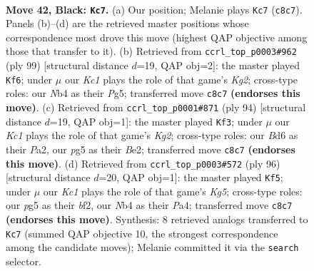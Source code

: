 \documentclass[11pt]{article}
\begin{document}
\clearpage

\begin{figure}[p]\centering
\begin{subfigure}{0.46\textwidth}\centering
\resizebox{\linewidth}{!}{%
\newchessgame
\chessboard[
  setfen={2k5/B7/3b2p1/6P1/pnb5/8/8/4K1N1 b - - 19 42},
  showmover=false,
  pgfstyle=straightmove, color=movearrow, markmove={c8-c7}
]}
\caption{}
\end{subfigure}\hfill
\begin{subfigure}{0.46\textwidth}\centering
\resizebox{\linewidth}{!}{%
\newchessgame
\chessboard[
  setfen={8/1b2b1k1/4p3/6p1/3P4/3B2P1/3N1K2/8 b - - 3 50},
  showmover=false,
  pgfstyle=straightmove, color=movearrow, markmove={g7-f6}
]}
\caption{}
\end{subfigure}
\\[4pt]
\begin{subfigure}{0.46\textwidth}\centering
\resizebox{\linewidth}{!}{%
\newchessgame
\chessboard[
  setfen={8/p7/3k3p/8/1P1b4/8/P3B1KP/8 w - - 3 48},
  showmover=false,
  pgfstyle=straightmove, color=movearrow, markmove={g2-f3}
]}
\caption{}
\end{subfigure}\hfill
\begin{subfigure}{0.46\textwidth}\centering
\resizebox{\linewidth}{!}{%
\newchessgame
\chessboard[
  setfen={5k2/8/4P3/p2p2K1/P7/2p5/2B2bP1/8 w - - 0 49},
  showmover=false,
  pgfstyle=straightmove, color=movearrow, markmove={g5-f5}
]}
\caption{}
\end{subfigure}
\caption{\textbf{Move 42, Black: \texttt{Kc7}.} (a) Our position; Melanie plays \texttt{Kc7} (\texttt{c8c7}). Panels (b)--(d) are the retrieved master positions whose correspondence most drove this move (highest QAP objective among those that transfer to it). (b) Retrieved from \texttt{ccrl\_top\_p0003\#962} (ply 99) [structural distance $d$=19, QAP obj=2]: the master played \texttt{Kf6}; under $\mu$ our \emph{Kc1} plays the role of that game's \emph{Kg2}; cross-type roles: our \emph{N}b4 as their \emph{P}g5; transferred move \texttt{c8c7} \textbf{(endorses this move)}. (c) Retrieved from \texttt{ccrl\_top\_p0001\#871} (ply 94) [structural distance $d$=19, QAP obj=1]: the master played \texttt{Kf3}; under $\mu$ our \emph{Kc1} plays the role of that game's \emph{Kg2}; cross-type roles: our \emph{B}d6 as their \emph{P}a2, our \emph{p}g5 as their \emph{B}e2; transferred move \texttt{c8c7} \textbf{(endorses this move)}. (d) Retrieved from \texttt{ccrl\_top\_p0003\#572} (ply 96) [structural distance $d$=20, QAP obj=1]: the master played \texttt{Kf5}; under $\mu$ our \emph{Kc1} plays the role of that game's \emph{Kg5}; cross-type roles: our \emph{p}g5 as their \emph{b}f2, our \emph{N}b4 as their \emph{P}a4; transferred move \texttt{c8c7} \textbf{(endorses this move)}. Synthesis: 8 retrieved analogs transferred to \texttt{Kc7} (summed QAP objective 10, the strongest correspondence among the candidate moves); Melanie committed it via the \texttt{search} selector.}
\label{fig:thought-m83}
\end{figure}
\end{document}
